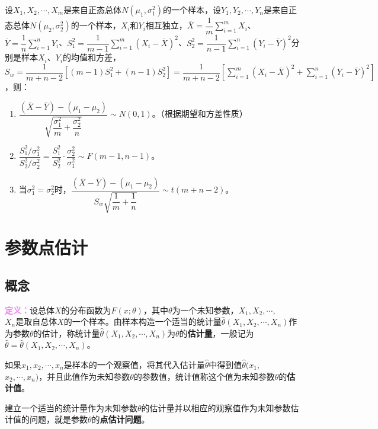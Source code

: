 \documentclass[UTF8, 12pt]{ctexart}
\begin{document}
设$X_1,X_2,\cdots,X_m$是来自正态总体$N(\mu_1,\sigma_1^2)$的一个样本，设$Y_1,Y_2,\cdots,Y_n$是来自正态总体$N(\mu_2,\sigma_2^2)$的一个样本，$X_i$和$Y_i$相互独立，$\overline{X}=\dfrac{1}{m}\sum\limits_{i=1}^mX_i$、$\overline{Y}=\dfrac{1}{n}\sum\limits_{i=1}^nY_i$、$S_1^2=\dfrac{1}{m-1}\sum\limits_{i=1}^m(X_i-\overline{X})^2$、$S_2^2=\dfrac{1}{n-1}\sum\limits_{i=1}^n(Y_i-\overline{Y})^2$分别是样本$X_i$、$Y_i$的均值和方差，$S_w=\dfrac{1}{m+n-2}[(m-1)S_1^2+(n-1)S_2^2]=\dfrac{1}{m+n-2}[\sum\limits_{i=1}^m(X_i-\overline{X})^2+\sum\limits_{i=1}^n(Y_i-\overline{Y})^2]$，则：

\begin{enumerate}
    \item $\dfrac{(\overline{X}-\overline{Y})-(\mu_1-\mu_2)}{\sqrt{\dfrac{\sigma_1^2}{m}+\dfrac{\sigma_2^2}{n}}}\sim N(0,1)$。（根据期望和方差性质）
    \item $\dfrac{S_1^2/\sigma_1^2}{S_2^2/\sigma_2^2}=\dfrac{S_1^2}{S_2^2}\cdot\dfrac{\sigma_2^2}{\sigma_1^2}\sim F(m-1,n-1)$。
    \item 当$\sigma_1^2=\sigma_2^2$时，$\dfrac{(\overline{X}-\overline{Y})-(\mu_1-\mu_2)}{S_w\sqrt{\dfrac{1}{m}+\dfrac{1}{n}}}\sim t(m+n-2)$。
\end{enumerate}

\section{参数点估计}

\subsection{概念}

\textcolor{violet}{\textbf{定义：}}设总体$X$的分布函数为$F(x;\theta)$，其中$\theta$为一个未知参数，$X_1,X_2,\cdots,$\\$X_n$是取自总体$X$的一个样本。由样本构造一个适当的统计量$\hat{\theta}(X_1,X_2,\cdots,X_n)$作为参数$\theta$的估计，称统计量$\hat{\theta}(X_1,X_2,\cdots,X_n)$为$\theta$的\textbf{估计量}，一般记为$\hat{\theta}=\hat{\theta}(X_1,X_2,\cdots,X_n)$。

如果$x_1,x_2,\cdots,x_n$是样本的一个观察值，将其代入估计量$\hat{\theta}$中得到值$\hat{\theta}(x_1,$\\$x_2,\cdots,x_n)$，并且此值作为未知参数$\theta$的参数值，统计值称这个值为未知参数$\theta$的\textbf{估计值}。

建立一个适当的统计量作为未知参数$\theta$的估计量并以相应的观察值作为未知参数估计值的问题，就是参数$\theta$的\textbf{点估计问题}。
\end{document}
